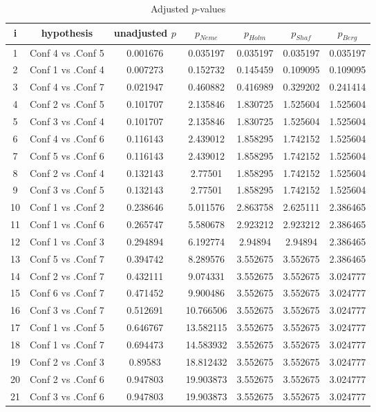 \documentclass[a4paper,10pt]{article}
\begin{document}
\begin{landscape}
\begin{table}[!htp]
\centering\scriptsize
\begin{tabular}{ccccccc}
i&hypothesis&unadjusted $p$&$p_{Neme}$&$p_{Holm}$&$p_{Shaf}$&$p_{Berg}$\\
\hline1&Conf 4 vs .Conf 5&0.001676&0.035197&0.035197&0.035197&0.035197\\
2&Conf 1 vs .Conf 4&0.007273&0.152732&0.145459&0.109095&0.109095\\
3&Conf 4 vs .Conf 7&0.021947&0.460882&0.416989&0.329202&0.241414\\
4&Conf 2 vs .Conf 5&0.101707&2.135846&1.830725&1.525604&1.525604\\
5&Conf 3 vs .Conf 4&0.101707&2.135846&1.830725&1.525604&1.525604\\
6&Conf 4 vs .Conf 6&0.116143&2.439012&1.858295&1.742152&1.525604\\
7&Conf 5 vs .Conf 6&0.116143&2.439012&1.858295&1.742152&1.525604\\
8&Conf 2 vs .Conf 4&0.132143&2.77501&1.858295&1.742152&1.525604\\
9&Conf 3 vs .Conf 5&0.132143&2.77501&1.858295&1.742152&1.525604\\
10&Conf 1 vs .Conf 2&0.238646&5.011576&2.863758&2.625111&2.386465\\
11&Conf 1 vs .Conf 6&0.265747&5.580678&2.923212&2.923212&2.386465\\
12&Conf 1 vs .Conf 3&0.294894&6.192774&2.94894&2.94894&2.386465\\
13&Conf 5 vs .Conf 7&0.394742&8.289576&3.552675&3.552675&2.386465\\
14&Conf 2 vs .Conf 7&0.432111&9.074331&3.552675&3.552675&3.024777\\
15&Conf 6 vs .Conf 7&0.471452&9.900486&3.552675&3.552675&3.024777\\
16&Conf 3 vs .Conf 7&0.512691&10.766506&3.552675&3.552675&3.024777\\
17&Conf 1 vs .Conf 5&0.646767&13.582115&3.552675&3.552675&3.024777\\
18&Conf 1 vs .Conf 7&0.694473&14.583932&3.552675&3.552675&3.024777\\
19&Conf 2 vs .Conf 3&0.89583&18.812432&3.552675&3.552675&3.024777\\
20&Conf 2 vs .Conf 6&0.947803&19.903873&3.552675&3.552675&3.024777\\
21&Conf 3 vs .Conf 6&0.947803&19.903873&3.552675&3.552675&3.024777\\
\hline
\end{tabular}
\caption{Adjusted $p$-values}
\end{table}

\end{landscape}
\end{document}
